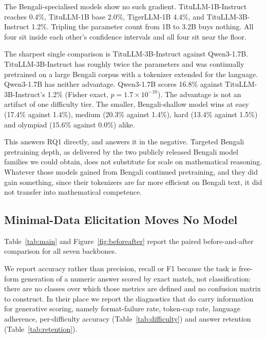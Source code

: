 \documentclass[10pt,twocolumn,letterpaper]{article}
\begin{document}
The Bengali-specialised models show no such gradient. TituLLM-1B-Instruct
reaches 0.4\%, TituLLM-1B base 2.0\%, TigerLLM-1B 4.4\%, and TituLLM-3B-Instruct
1.2\%. Tripling the parameter count from 1B to 3.2B buys nothing. All four sit
inside each other's confidence intervals and all four sit near the floor.

The sharpest single comparison is TituLLM-3B-Instruct against Qwen3-1.7B.
TituLLM-3B-Instruct has roughly twice the parameters and was continually
pretrained on a large Bengali corpus with a tokenizer extended for the
language. Qwen3-1.7B has neither advantage. Qwen3-1.7B scores 16.8\% against
TituLLM-3B-Instruct's 1.2\% (Fisher exact, $p=1.7\times10^{-10}$). The
advantage is not an artifact of one difficulty tier. The smaller, Bengali-shallow model wins at easy (17.4\% against 1.4\%),
medium (20.3\% against 1.4\%), hard (13.4\% against 1.5\%) and olympiad (15.6\%
against 0.0\%) alike.

This answers RQ1 directly, and answers it in the negative. Targeted Bengali
pretraining depth, as delivered by the two publicly released Bengali model
families we could obtain, does not substitute for scale on mathematical
reasoning. Whatever those models gained from Bengali continued pretraining, and
they did gain something, since their tokenizers are far more efficient on
Bengali text, it did not transfer into mathematical competence.

\subsection{Minimal-Data Elicitation Moves No Model}
\label{sec:rq1b}

Table~\ref{tab:main} and Figure~\ref{fig:beforeafter} report the paired
before-and-after comparison for all seven backbones.

We report accuracy rather than precision, recall or F1 because the task is
free-form generation of a numeric answer scored by exact match, not
classification: there are no classes over which those metrics are defined and
no confusion matrix to construct. In their place we report the diagnostics that
do carry information for generative scoring, namely format-failure rate,
token-cap rate, language adherence, per-difficulty accuracy
(Table~\ref{tab:difficulty}) and answer retention
(Table~\ref{tab:retention}).
\end{document}
